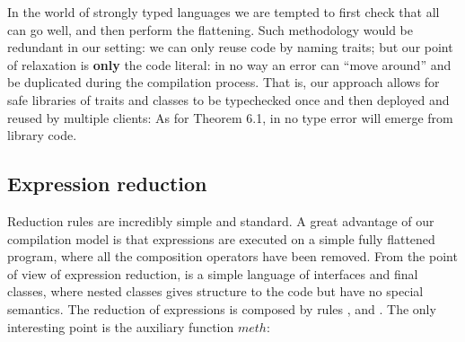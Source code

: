 %
%
%
%



\noindent 
In the world of strongly typed languages we are tempted to
first check that all can go well, and then perform the flattening. 
Such methodology would be redundant in our setting: we can only reuse code by naming traits; but our point of relaxation is {\bf only} the code literal: in no way an error can ``move around'' and be duplicated during the compilation process.
That is, our approach allows for safe libraries of traits and classes to be typechecked once and then deployed and reused by multiple clients: As for Theorem 6.1, in \name no type error will emerge from library code.


\saveSpace
\subsection{Expression reduction}
\saveSpace
Reduction rules are incredibly simple and standard.
A great advantage of our compilation model is that expressions are executed on
a simple fully flattened program, 
where all the composition operators have been removed.
From the point of view of expression reduction, \name is a simple language of 
interfaces and final classes, where nested classes gives structure to the code but have no special semantics.
The reduction of expressions is composed by rules
, and .
The only interesting point is the auxiliary function $\mathit{meth}$:


